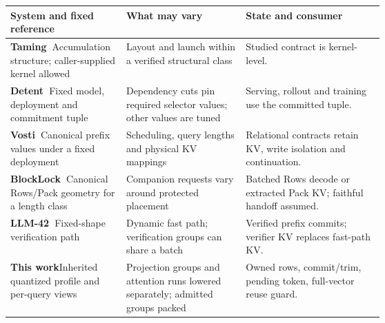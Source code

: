 \begingroup
\fontsize{8.7}{10.5}\selectfont
\setlength{\tabcolsep}{4.0pt}\renewcommand{\arraystretch}{1.03}
\noindent
\begin{tabularx}{\linewidth}{@{}>{\raggedright\arraybackslash}p{0.31\linewidth}>{\raggedright\arraybackslash}p{0.32\linewidth}>{\raggedright\arraybackslash}X@{}}
\toprule
System and fixed reference & What may vary & State and consumer\\
\midrule
\textbf{Taming~\cite{taming}}\newline Accumulation structure; caller-supplied kernel allowed & Layout and launch within a verified structural class & Studied contract is kernel-level.\\
\addlinespace[2.5pt]
\textbf{Detent~\cite{detent}}\newline Fixed model, deployment and commitment tuple & Dependency cuts pin required selector values; other values are tuned & Serving, rollout and training use the committed tuple.\\
\addlinespace[2.5pt]
\textbf{Vosti~\cite{vosti}}\newline Canonical prefix values under a fixed deployment & Scheduling, query lengths and physical KV mappings & Relational contracts retain KV, write isolation and continuation.\\
\addlinespace[2.5pt]
\textbf{BlockLock~\cite{blocklock}}\newline Canonical Rows/Pack geometry for a length class & Companion requests vary around protected placement & Batched Rows decode or extracted Pack KV; faithful handoff assumed.\\
\addlinespace[2.5pt]
\textbf{LLM-42~\cite{llm42}}\newline Fixed-shape verification path & Dynamic fast path; verification groups can share a batch & Verified prefix commits; verifier KV replaces fast-path KV.\\
\midrule
\textbf{This work}\newline Inherited quantized profile and per-query views & Projection groups and attention runs lowered separately; admitted groups packed & Owned rows, commit/trim, pending token, full-vector reuse guard.\\
\bottomrule
\end{tabularx}
\par\endgroup
